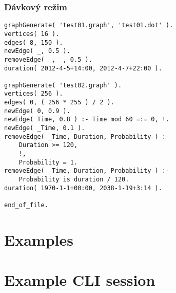 \documentclass[11pt, a4paper,draft]{article}
\theoremstyle{plain}
\theoremstyle{definition}
\theoremstyle{remark}
\begin{document}
\subsubsection{Dávkový režim}

\begin{lstlisting}[firstnumber=1]
% gen_graph.pl
graphGenerate( 'test01.graph', 'test01.dot' ).
vertices( 16 ).
edges( 8, 150 ).
newEdge( _, 0.5 ).
removeEdge( _, _, 0.5 ).
duration( 2012-4-5+14:00, 2012-4-7+22:00 ).

graphGenerate( 'test02.graph' ).
vertices( 256 ).
edges( 0, ( 256 * 255 ) / 2 ).
newEdge( 0, 0.9 ).
newEdge( Time, 0.8 ) :- Time mod 60 =:= 0, !.
newEdge( _Time, 0.1 ).
removeEdge( _Time, Duration, Probability ) :-
    Duration >= 120,
    !,
    Probability = 1.
removeEdge( _Time, Duration, Probability ) :-
    Probability is duration / 120.
duration( 1970-1-1+00:00, 2038-1-19+3:14 ).

end_of_file.
\end{lstlisting}

\section{Examples}
\section{Example CLI session}
\label{sec:exmaple-cli}

\end{document}
